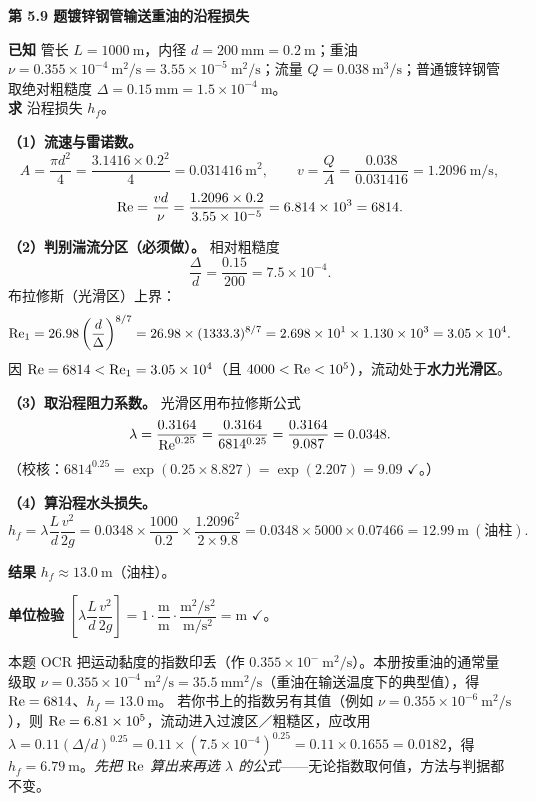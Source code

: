 \noindent\textbf{第 5.9 题\quad 镀锌钢管输送重油的沿程损失}

\begin{jie}
\textbf{已知} 管长 $L=1000\ \mathrm{m}$，内径 $d=200\ \mathrm{mm}=0.2\ \mathrm{m}$；重油 $\nu=0.355\times10^{-4}\ \mathrm{m^2/s}=3.55\times10^{-5}\ \mathrm{m^2/s}$；流量 $Q=0.038\ \mathrm{m^3/s}$；普通镀锌钢管取绝对粗糙度 $\Delta=0.15\ \mathrm{mm}=1.5\times10^{-4}\ \mathrm{m}$。\\
\textbf{求} 沿程损失 $h_f$。

\textbf{（1）流速与雷诺数。}
\[A=\frac{\pi d^2}{4}=\frac{3.1416\times0.2^2}{4}=0.031416\ \mathrm{m^2},\qquad
v=\frac{Q}{A}=\frac{0.038}{0.031416}=1.2096\ \mathrm{m/s},\]
\[\mathrm{Re}=\frac{vd}{\nu}=\frac{1.2096\times0.2}{3.55\times10^{-5}}=6.814\times10^3=6814.\]

\textbf{（2）判别湍流分区（必须做）。} 相对粗糙度
\[\frac{\Delta}{d}=\frac{0.15}{200}=7.5\times10^{-4}.\]
布拉修斯（光滑区）上界：
\[\mathrm{Re}_1=26.98\left(\frac{d}{\Delta}\right)^{8/7}=26.98\times(1333.3)^{8/7}=2.698\times10^1\times1.130\times10^3=3.05\times10^4.\]
因 $\mathrm{Re}=6814<\mathrm{Re}_1=3.05\times10^4$（且 $4000<\mathrm{Re}<10^5$），流动处于\textbf{水力光滑区}。

\textbf{（3）取沿程阻力系数。} 光滑区用布拉修斯公式
\[\lambda=\frac{0.3164}{\mathrm{Re}^{0.25}}=\frac{0.3164}{6814^{0.25}}=\frac{0.3164}{9.087}=0.0348.\]
（校核：$6814^{0.25}=\exp(0.25\times8.827)=\exp(2.207)=9.09$ $\checkmark$。）

\textbf{（4）算沿程水头损失。}
\[h_f=\lambda\frac{L}{d}\frac{v^2}{2g}=0.0348\times\frac{1000}{0.2}\times\frac{1.2096^2}{2\times9.8}
=0.0348\times5000\times0.07466=12.99\ \mathrm{m}\ (\text{油柱}).\]

\textbf{结果} $\boxed{h_f\approx13.0\ \mathrm{m}}$（油柱）。

\textbf{单位检验} $\left[\lambda\dfrac{L}{d}\dfrac{v^2}{2g}\right]=1\cdot\dfrac{\mathrm{m}}{\mathrm{m}}\cdot\dfrac{\mathrm{m^2/s^2}}{\mathrm{m/s^2}}=\mathrm{m}$ $\checkmark$。
\end{jie}
\begin{tishi}
本题 OCR 把运动黏度的指数印丢（作 $0.355\times10^{-}\ \mathrm{m^2/s}$）。本册按重油的通常量级取 $\nu=0.355\times10^{-4}\ \mathrm{m^2/s}=35.5\ \mathrm{mm^2/s}$（重油在输送温度下的典型值），得 $\mathrm{Re}=6814$、$h_f=13.0\ \mathrm{m}$。
若你书上的指数另有其值（例如 $\nu=0.355\times10^{-6}\ \mathrm{m^2/s}$），则 $\mathrm{Re}=6.81\times10^5$，流动进入过渡区／粗糙区，应改用 $\lambda=0.11(\Delta/d)^{0.25}=0.11\times(7.5\times10^{-4})^{0.25}=0.11\times0.1655=0.0182$，得 $h_f=6.79\ \mathrm{m}$。\emph{先把 $\mathrm{Re}$ 算出来再选 $\lambda$ 的公式}——无论指数取何值，方法与判据都不变。
\end{tishi}

